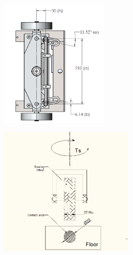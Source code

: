 \begin{figure}
	\centering
	\begin{minipage}{.5\textwidth}
		\centering
		\includegraphics[width=\linewidth,height=6.5cm,keepaspectratio]{Chapter3/fig/davis}
		\label{fig:davis}
	\end{minipage}%
	\begin{minipage}{.5\textwidth}
		\centering
		\includegraphics[width=\linewidth,height=6.5cm,keepaspectratio]{Chapter3/fig/steerTorqCal}
		\label{fig:steerTorq}
	\end{minipage}	
\end{figure} 

